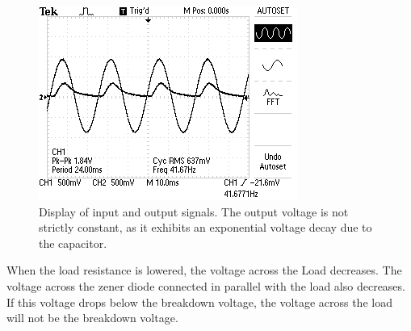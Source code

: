 \documentclass[twocolumn,english]{IEEEtran}
\begin{document}
\begin{figure}[H]
  \begin{centering}
  \begin{center}
  \includegraphics[width=\linewidth]{./Images/DC1.png}
  \caption{Display of input and output signals. The output voltage is not strictly constant, as it exhibits an exponential voltage decay due to the capacitor.}
  \label{fig:DC1}
  \end{center}
  \par\end{centering}
\end{figure}

When the load resistance is lowered, the voltage across the Load decreases. The voltage across the zener diode connected in parallel with the load also decreases. If this voltage drops below the breakdown voltage, the voltage across the load will not be the breakdown voltage.
\end{document}
